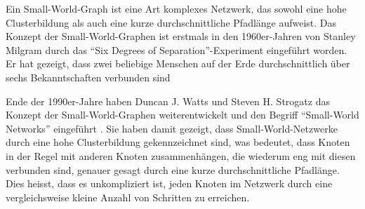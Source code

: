 Ein Small-World-Graph ist eine Art komplexes Netzwerk, das sowohl eine hohe Clusterbildung als auch eine kurze durchschnittliche Pfadlänge aufweist.
Das Konzept der Small-World-Graphen ist erstmals in den 1960er-Jahren von Stanley Milgram durch das \enquote{Six Degrees of Separation}-Experiment eingeführt worden.
Er hat gezeigt, dass zwei beliebige Menschen auf der Erde durchschnittlich über sechs Bekanntschaften verbunden sind  \cite[p.~62]{travers_experimental_1969}

Ende der 1990er-Jahre haben Duncan J. Watts und Steven H. Strogatz das Konzept der Small-World-Graphen weiterentwickelt und den Begriff \enquote{Small-World Networks} eingeführt \cite[p.~440]{watts_collective_1998}.
Sie haben damit gezeigt, dass Small-World-Netzwerke durch eine hohe Clusterbildung gekennzeichnet sind, was bedeutet, dass Knoten in der Regel mit anderen Knoten zusammenhängen, die wiederum eng mit diesen verbunden sind, genauer gesagt durch eine kurze durchschnittliche Pfadlänge.
Dies heisst, dass es unkompliziert ist, jeden Knoten im Netzwerk durch eine vergleichsweise kleine Anzahl von Schritten zu erreichen.

